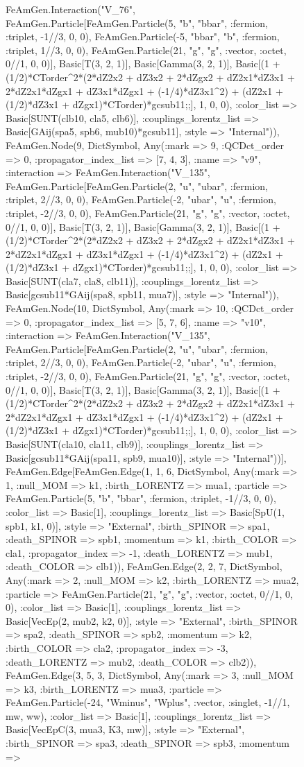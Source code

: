 \documentclass{revtex4}
\begin{document}
\begin{figure}[!htb]
\begin{center}
{FeAmGen.Interaction("V_76", FeAmGen.Particle[FeAmGen.Particle(5, "b", "bbar", :fermion, :triplet, -1//3, 0, 0), FeAmGen.Particle(-5, "bbar", "b", :fermion, :triplet, 1//3, 0, 0), FeAmGen.Particle(21, "g", "g", :vector, :octet, 0//1, 0, 0)], Basic[T(3, 2, 1)], Basic[Gamma(3, 2, 1)], Basic[(1 + (1/2)*CTorder^2*(2*dZ2x2 + dZ3x2 + 2*dZgx2 + dZ2x1*dZ3x1 + 2*dZ2x1*dZgx1 + dZ3x1*dZgx1 + (-1/4)*dZ3x1^2) + (dZ2x1 + (1/2)*dZ3x1 + dZgx1)*CTorder)*gcsub11;;], 1, 0, 0), :color_list => Basic[SUNT(clb10, cla5, clb6)], :couplings_lorentz_list => Basic[GAij(spa5, spb6, mub10)*gcsub11], :style => "Internal")), FeAmGen.Node(9, Dict{Symbol, Any}(:mark => 9, :QCDct_order => 0, :propagator_index_list => [7, 4, 3], :name => "v9", :interaction => FeAmGen.Interaction("V_135", FeAmGen.Particle[FeAmGen.Particle(2, "u", "ubar", :fermion, :triplet, 2//3, 0, 0), FeAmGen.Particle(-2, "ubar", "u", :fermion, :triplet, -2//3, 0, 0), FeAmGen.Particle(21, "g", "g", :vector, :octet, 0//1, 0, 0)], Basic[T(3, 2, 1)], Basic[Gamma(3, 2, 1)], Basic[(1 + (1/2)*CTorder^2*(2*dZ2x2 + dZ3x2 + 2*dZgx2 + dZ2x1*dZ3x1 + 2*dZ2x1*dZgx1 + dZ3x1*dZgx1 + (-1/4)*dZ3x1^2) + (dZ2x1 + (1/2)*dZ3x1 + dZgx1)*CTorder)*gcsub11;;], 1, 0, 0), :color_list => Basic[SUNT(cla7, cla8, clb11)], :couplings_lorentz_list => Basic[gcsub11*GAij(spa8, spb11, mua7)], :style => "Internal")), FeAmGen.Node(10, Dict{Symbol, Any}(:mark => 10, :QCDct_order => 0, :propagator_index_list => [5, 7, 6], :name => "v10", :interaction => FeAmGen.Interaction("V_135", FeAmGen.Particle[FeAmGen.Particle(2, "u", "ubar", :fermion, :triplet, 2//3, 0, 0), FeAmGen.Particle(-2, "ubar", "u", :fermion, :triplet, -2//3, 0, 0), FeAmGen.Particle(21, "g", "g", :vector, :octet, 0//1, 0, 0)], Basic[T(3, 2, 1)], Basic[Gamma(3, 2, 1)], Basic[(1 + (1/2)*CTorder^2*(2*dZ2x2 + dZ3x2 + 2*dZgx2 + dZ2x1*dZ3x1 + 2*dZ2x1*dZgx1 + dZ3x1*dZgx1 + (-1/4)*dZ3x1^2) + (dZ2x1 + (1/2)*dZ3x1 + dZgx1)*CTorder)*gcsub11;;], 1, 0, 0), :color_list => Basic[SUNT(cla10, cla11, clb9)], :couplings_lorentz_list => Basic[gcsub11*GAij(spa11, spb9, mua10)], :style => "Internal"))], FeAmGen.Edge[FeAmGen.Edge(1, 1, 6, Dict{Symbol, Any}(:mark => 1, :null_MOM => k1, :birth_LORENTZ => mua1, :particle => FeAmGen.Particle(5, "b", "bbar", :fermion, :triplet, -1//3, 0, 0), :color_list => Basic[1], :couplings_lorentz_list => Basic[SpU(1, spb1, k1, 0)], :style => "External", :birth_SPINOR => spa1, :death_SPINOR => spb1, :momentum => k1, :birth_COLOR => cla1, :propagator_index => -1, :death_LORENTZ => mub1, :death_COLOR => clb1)), FeAmGen.Edge(2, 2, 7, Dict{Symbol, Any}(:mark => 2, :null_MOM => k2, :birth_LORENTZ => mua2, :particle => FeAmGen.Particle(21, "g", "g", :vector, :octet, 0//1, 0, 0), :color_list => Basic[1], :couplings_lorentz_list => Basic[VecEp(2, mub2, k2, 0)], :style => "External", :birth_SPINOR => spa2, :death_SPINOR => spb2, :momentum => k2, :birth_COLOR => cla2, :propagator_index => -3, :death_LORENTZ => mub2, :death_COLOR => clb2)), FeAmGen.Edge(3, 5, 3, Dict{Symbol, Any}(:mark => 3, :null_MOM => k3, :birth_LORENTZ => mua3, :particle => FeAmGen.Particle(-24, "Wminus", "Wplus", :vector, :singlet, -1//1, mw, ww), :color_list => Basic[1], :couplings_lorentz_list => Basic[VecEpC(3, mua3, K3, mw)], :style => "External", :birth_SPINOR => spa3, :death_SPINOR => spb3, :momentum => }
\end{center}
\end{figure}
\end{document}
